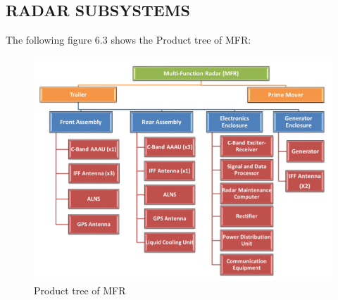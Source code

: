 \documentclass[14pt]{article} %
\begin{document}
\subsection{RADAR SUBSYSTEMS}
The following figure 6.3 shows the Product tree of MFR: 

 \begin{figure}[H]
  \includegraphics[width=\linewidth]{MFR.png}
  \caption{Product tree of MFR}
  \label{fig:figure 9}
\end{figure}
\end{document}
